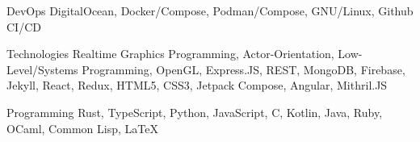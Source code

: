 

\begin{cvskills}

  \cvskill
    {DevOps} %
    {DigitalOcean, Docker/Compose, Podman/Compose, GNU/Linux, Github CI/CD} %

  \cvskill
    {Technologies} %
    {Realtime Graphics Programming, Actor-Orientation, Low-Level/Systems Programming, OpenGL, Express.JS, REST, MongoDB, Firebase, Jekyll, React, Redux, HTML5, CSS3, Jetpack Compose, Angular, Mithril.JS} %

  \cvskill
    {Programming} %
    {Rust, TypeScript, Python, JavaScript, C, Kotlin, Java, Ruby, OCaml, Common Lisp, LaTeX} %

\end{cvskills}
